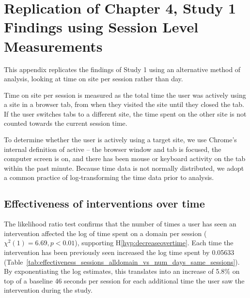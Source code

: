 
\chapter{Replication of Chapter 4, Study 1 Findings using Session Level Measurements}


This appendix replicates the findings of Study 1 using an alternative method of analysis, looking at time on site per session rather than day.

Time on site per session is measured as the total time the user was actively using a site in a browser tab, from when they visited the site until they closed the tab. If the user switches tabs to a different site, the time spent on the other site is not counted towards the current session time.

To determine whether the user is actively using a target site, we use Chrome's internal definition of active -- the browser window and tab is focused, the computer screen is on, and there has been mouse or keyboard activity on the tab within the past minute. 
Because time data is not normally distributed, we adopt a common practice of log-transforming the time data prior to analysis.


\section{Effectiveness of interventions over time}

The likelihood ratio test confirms that the number of times a user has seen an intervention affected the log of time spent on a domain per session ($\chi^{2}(1) = 6.69, p < 0.01$), supporting H\ref*{hyp:decreaseovertime}. Each time the intervention has been previously seen increased the log time spent by 0.05633 (Table~\ref{tab:effectiveness_sessions_alldomain_vs_num_days_same_sessions}). By exponentiating the log estimates, this translates into an increase of 5.8\% on top of a baseline 46 seconds per session for each additional time the user saw the intervention during the study. %

